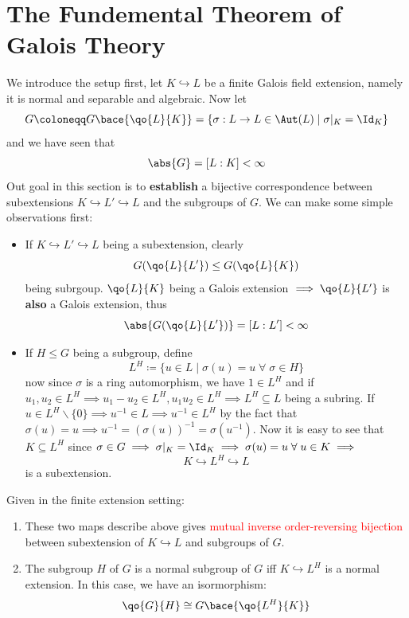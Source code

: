 \section{The Fundemental Theorem of Galois Theory}
We introduce the setup first, let \( K \hookrightarrow L \) be a finite Galois field extension,
namely it is normal and separable and algebraic. Now let
\[
	G \coloneqq G\bace{\qo{L}{K}} = \{\sigma : L \to L \in \Aut(L) \; | \; \sigma|_K = \Id_K\}
\]
and we have seen that
\[
	\abs{G} = [L:K] < \infty
\]
Out goal in this section is to \textbf{establish} a bijective correspondence between subextensions
\( K \hookrightarrow L' \hookrightarrow L \) and the subgroups of \( G \). We can make some simple
observations first:
\begin{itemize}
	\item If \( K \hookrightarrow L' \hookrightarrow L \) being a subextension, clearly
	      \[
		      G(\qo{L}{L'}) \leq G(\qo{L}{K})
	      \]
	      being subrgoup. \( \qo{L}{K} \) being a Galois extension \( \implies \qo{L}{L'} \) is \textbf{also} a Galois extension, thus
	      \[
		      \abs{G(\qo{L}{L'})} = [L:L'] < \infty
	      \]
	\item If \( H \leq G \) being a subgroup, define
	      \[
		      L^H \coloneqq  \{u\in L \; | \; \sigma(u) = u \; \forall \; \sigma \in H\}
	      \]
	      now since \( \sigma \) is a ring automorphism, we have \( 1 \in L^H \) and if \( u_1,u_2\in L^H \implies u_1 - u_2
	      \in L^H, u_1u_2 \in L^H \implies L^H \subseteq L\) being a subring. If \( u\in L^H
	      \smallsetminus \{0\} \implies u^{-1} \in L \implies u^{-1} \in L^H \) by the fact that \(
	      \sigma(u) = u \implies u^{-1} = (\sigma(u))^{-1} = \sigma(u^{-1}) \). Now it is easy to see that
	      \( K \subseteq L^H \) since \( \sigma \in G \implies \sigma|_K = \Id_K \implies \sigma(u) = u \;
	      \forall \; u \in K \implies \)
	      \[
		      K \hookrightarrow L^H \hookrightarrow L
	      \]
	      is a subextension.
\end{itemize}

\begin{theorem}
	Given in the finite extension setting:
	\begin{enumerate}
		\item These two maps describe above gives \textcolor{red}{mutual inverse order-reversing bijection} between
		      subextension of \( K \hookrightarrow L \) and subgroups of \( G \).
		\item The subgroup \( H \) of \( G \) is a normal subgroup of \( G \) iff \( K \hookrightarrow
		      L^H \) is a normal extension. In this case, we have an isormorphism:
		      \[
			      \qo{G}{H} \cong G\bace{\qo{L^H}{K}}
		      \]
	\end{enumerate}
\end{theorem}

